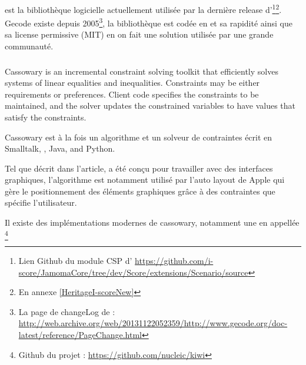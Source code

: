 \subsubsection{\gecode{}}

\gecode{} est la bibliothèque logicielle actuellement utilisée par la dernière release d'\iscore{}\footnote{Lien Github du module CSP d'\iscore{} \url{https://github.com/i-score/JamomaCore/tree/dev/Score/extensions/Scenario/source}}\footnote{En annexe \ref{HeritageI-scoreNew}}. 
Gecode existe depuis 2005\footnote{La page de changeLog de \gecode{} : \url{http://web.archive.org/web/20131122052359/http://www.gecode.org/doc-latest/reference/PageChange.html}}, la bibliothèque est codée en \cpp{} et sa rapidité\cite{Minizinc2015} ainsi que sa license permissive (MIT\cite{Mit2015}) en on fait une solution utilisée par une grande communauté.

\subsubsection{\cassowary{}}

\begin{citeauteur}
Cassowary is an incremental constraint solving toolkit that efficiently solves systems of linear equalities and inequalities. Constraints may be either requirements or preferences. Client code specifies the constraints to be maintained, and the solver updates the constrained variables to have values that satisfy the constraints.
\end{citeauteur}

Cassowary est à la fois un algorithme\cite{Borning:1997:SLA:263407.263518} et un solveur de contraintes\cite{Badros98thecassowary} écrit en Smalltalk, \cpp{}, Java, and Python\footnotemark[\value{footnote}]{}.


Tel que décrit dans l'article\cite{Borning:1997:SLA:263407.263518}, \cassowary{} a été conçu pour travailler avec des interfaces graphiques, l'algorithme est notamment utilisé par l'auto layout de Apple\cite{sadun2013ios} qui gère le positionnement des éléments graphiques grâce à des contraintes que spécifie l'utilisateur.

Il existe des implémentations modernes de cassowary, notamment une en \cpp{} appellée \kiwi{}\footnote{Github du projet \kiwi{} : \url{https://github.com/nucleic/kiwi}}

